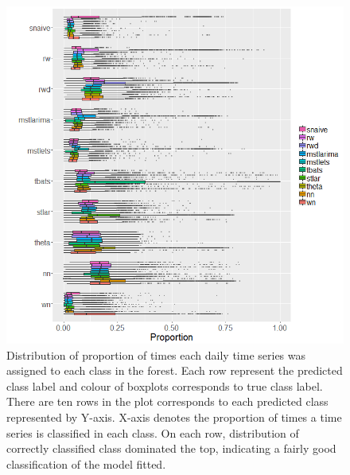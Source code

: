 \documentclass[11pt,a4paper,]{article}
\theoremstyle{definition}
\theoremstyle{definition}
\theoremstyle{definition}
\theoremstyle{remark}
\begin{document}
\begin{figure}
\centering
\includegraphics{figures/oobdaily-1.png}
\caption{\label{fig:oobdaily}Distribution of proportion of times each daily
time series was assigned to each class in the forest. Each row represent
the predicted class label and colour of boxplots corresponds to true
class label. There are ten rows in the plot corresponds to each
predicted class represented by Y-axis. X-axis denotes the proportion of
times a time series is classified in each class. On each row,
distribution of correctly classified class dominated the top, indicating
a fairly good classification of the model fitted.}
\end{figure}

\newpage
\end{document}
